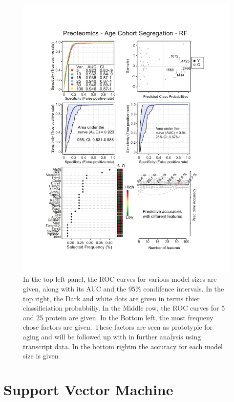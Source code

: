 \documentclass[a4paper]{book}
\begin{document}
	\begin{figure}[htb!]
		\centering
		\includegraphics[width=0.95\linewidth]{3.Proteomics/Proteomics_Vingette_Random_Forest_Age}
		\caption[Random Forest Classifier for Young and Old Mice]{In the top left panel, the ROC curves for various model sizes are given, along with its AUC and the 95\% condifence intervals. In the top right, the Dark and white dots are given in terms thier classificiation probabbiliy. In the Middle row, the ROC curves for 5 and 25 protein are given. In the Bottom left, the most frequeny chose factors are given. These factors are seen as prototypic for aging and will be followed up with in further analysis using transcript data. In the bottom rightm the accuracy for each model size is given}
		\label{fig:proteomicsvingetterandomforestage}
	\end{figure}
	
	
	\section{Support Vector Machine}
	
\end{document}
